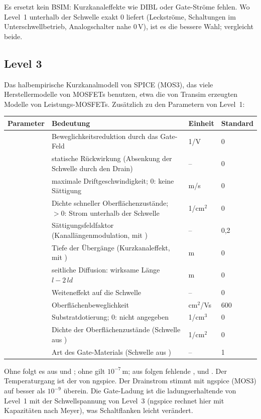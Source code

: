 Es ersetzt kein BSIM: Kurzkanaleffekte wie DIBL oder Gate-Ströme fehlen.
Wo Level~1 unterhalb der Schwelle exakt 0 liefert (Leckströme, Schaltungen
im Unterschwellbetrieb, Analogschalter nahe 0\,V), ist es die bessere Wahl;
 vergleicht beide.

\subsection{Level 3}

Das halbempirische Kurzkanalmodell von SPICE (MOS3), das viele
Herstellermodelle von MOSFETs benutzen, etwa die von Transim erzeugten
Modelle von Leistungs-MOSFETs. Zusätzlich zu den Parametern von Level~1:

\begin{longtable}{@{}lP{8.2cm}ll@{}}
  \toprule
  Parameter & Bedeutung & Einheit & Standard \\
  \midrule
  \endhead
  \bottomrule
  \endfoot
   & Beweglichkeitsreduktion durch das Gate-Feld & 1/V & 0 \\
   & statische Rückwirkung (Absenkung der Schwelle durch den Drain) & – & 0 \\
   & maximale Driftgeschwindigkeit; 0: keine Sättigung & m/s & 0 \\
   & Dichte schneller Oberflächenzustände; $>0$: Strom unterhalb der Schwelle & 1/cm$^2$ & 0 \\
   & Sättigungsfeldfaktor (Kanallängenmodulation, mit ) & – & 0,2 \\
   & Tiefe der Übergänge (Kurzkanaleffekt, mit ) & m & 0 \\
   & seitliche Diffusion: wirksame Länge $l - 2\,\mathit{ld}$ & m & 0 \\
   & Weiteneffekt auf die Schwelle & – & 0 \\
   & Oberflächenbeweglichkeit & cm$^2$/Vs & 600 \\
   & Substratdotierung; 0: nicht angegeben & 1/cm$^3$ & 0 \\
   & Dichte der Oberflächenzustände (Schwelle aus ) & 1/cm$^2$ & 0 \\
   & Art des Gate-Materials (Schwelle aus ) & – & 1 \\
\end{longtable}

Ohne  folgt es aus  und ; ohne  gilt
$10^{-7}$\,m; aus  folgen fehlende ,  und
. Der Temperaturgang ist der von ngspice. Der Drainstrom stimmt
mit ngspice (MOS3) auf besser als $10^{-9}$ überein. Die Gate-Ladung ist
die ladungserhaltende von Level~1 mit der Schwellspannung von Level~3
(ngspice rechnet hier mit Kapazitäten nach Meyer), was Schaltflanken leicht
verändert.

